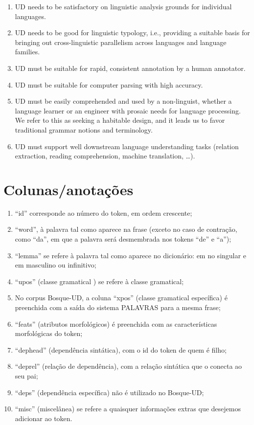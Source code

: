 \documentclass[output=paper,colorlinks,citecolor=brown]{langscibook}
\begin{document}
	\begin{enumerate}
		\item UD needs to be satisfactory on linguistic analysis grounds for individual languages.
		\item UD needs to be good for linguistic typology, i.e., providing a suitable basis for bringing out cross-linguistic parallelism across languages and language families.
		\item UD must be suitable for rapid, consistent annotation by a human annotator.
		\item UD must be suitable for computer parsing with high accuracy.
		\item UD must be easily comprehended and used by a non-linguist, whether a language learner or an engineer with prosaic needs for language processing. We refer to this as seeking a habitable design, and it leads us to favor traditional grammar notions and terminology.
		\item UD must support well downstream language understanding tasks (relation extraction, reading comprehension, machine translation, …).
	\end{enumerate}

\section{Colunas/anotações}\label{sec:colunas}



\begin{enumerate}
    \item “id” corresponde ao número do token, em ordem crescente;
    \item “word”, à palavra tal como aparece na frase (exceto no caso de contração, como “da”, em que a palavra será desmembrada nos tokens “de” e “a”);
    \item “lemma” se refere à palavra tal como aparece no dicionário: em no singular e em masculino ou infinitivo;
    \item “upos” (classe gramatical ) se refere à classe gramatical;
    \item No corpus Bosque-UD, a coluna “xpos” (classe gramatical específica) é preenchida com a saída do sistema PALAVRAS para a mesma frase;
    \item “feats” (atributos morfológicos) é preenchida com as características morfológicas do token;
    \item “dephead” (dependência sintática), com o id do token de quem é filho;
    \item “deprel” (relação de dependência), com a relação sintática que o conecta ao seu pai;
    \item “deps” (dependência específica) não é utilizado no Bosque-UD;
    \item “misc” (miscelânea) se refere a quaisquer informações extras que desejemos adicionar ao token.
\end{enumerate}{}
\end{document}

